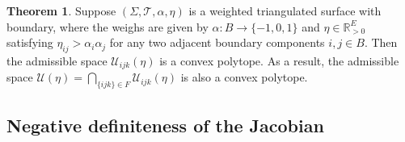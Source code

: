 \documentclass[12pt]{amsart}
\theoremstyle{definition}
\newtheorem{theorem}{Theorem}[section]
\begin{document}
\begin{theorem}\label{Thm: ASC 1}
Suppose $(\Sigma,\mathcal{T},\alpha,\eta)$ is a weighted triangulated surface with boundary, where the weighs are given by $\alpha: B\rightarrow \{-1,0,1\}$ and $\eta\in \mathbb{R}_{>0}^E$ satisfying $\eta_{ij}>\alpha_i\alpha_j$ for any two adjacent boundary components $i,j\in B$.
Then the admissible space $\mathcal{U}_{ijk}(\eta)$ is a convex polytope.
As a result, the admissible space
$\mathcal{U}(\eta)=\bigcap_{\{ijk\}\in F}\mathcal{U}_{ijk}(\eta)$
is also a convex polytope.
\end{theorem}

\subsection{Negative definiteness of the Jacobian}
\label{subsec: matrix}
\end{document}
